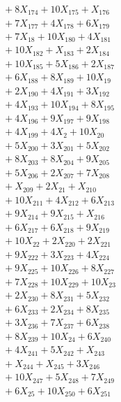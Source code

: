\documentclass[a4paper,10pt]{article}
\begin{document}
{\begin{align}
&\quad  + 8X_{174} + 10X_{175} + X_{176} \\[0.5ex]
&\quad  + 7X_{177} + 4X_{178} + 6X_{179} \\[0.5ex]
&\quad  + 7X_{18} + 10X_{180} + 4X_{181} \\[0.5ex]
&\quad  + 10X_{182} + X_{183} + 2X_{184} \\[0.5ex]
&\quad  + 10X_{185} + 5X_{186} + 2X_{187} \\[0.5ex]
&\quad  + 6X_{188} + 8X_{189} + 10X_{19} \\[0.5ex]
&\quad  + 2X_{190} + 4X_{191} + 3X_{192} \\[0.5ex]
&\quad  + 4X_{193} + 10X_{194} + 8X_{195} \\[0.5ex]
&\quad  + 4X_{196} + 9X_{197} + 9X_{198} \\[0.5ex]
&\quad  + 4X_{199} + 4X_{2} + 10X_{20} \\[0.5ex]
&\quad  + 5X_{200} + 3X_{201} + 5X_{202} \\[0.5ex]
&\quad  + 8X_{203} + 8X_{204} + 9X_{205} \\[0.5ex]
&\quad  + 5X_{206} + 2X_{207} + 7X_{208} \\[0.5ex]
&\quad  + X_{209} + 2X_{21} + X_{210} \\[0.5ex]
&\quad  + 10X_{211} + 4X_{212} + 6X_{213} \\[0.5ex]
&\quad  + 9X_{214} + 9X_{215} + X_{216} \\[0.5ex]
&\quad  + 6X_{217} + 6X_{218} + 9X_{219} \\[0.5ex]
&\quad  + 10X_{22} + 2X_{220} + 2X_{221} \\[0.5ex]
&\quad  + 9X_{222} + 3X_{223} + 4X_{224} \\[0.5ex]
&\quad  + 9X_{225} + 10X_{226} + 8X_{227} \\[0.5ex]
&\quad  + 7X_{228} + 10X_{229} + 10X_{23} \\[0.5ex]
&\quad  + 2X_{230} + 8X_{231} + 5X_{232} \\[0.5ex]
&\quad  + 6X_{233} + 2X_{234} + 8X_{235} \\[0.5ex]
&\quad  + 3X_{236} + 7X_{237} + 6X_{238} \\[0.5ex]
&\quad  + 8X_{239} + 10X_{24} + 6X_{240} \\[0.5ex]
&\quad  + 4X_{241} + 5X_{242} + X_{243} \\[0.5ex]
&\quad  + X_{244} + X_{245} + 3X_{246} \\[0.5ex]
&\quad  + 10X_{247} + 5X_{248} + 7X_{249} \\[0.5ex]
&\quad  + 6X_{25} + 10X_{250} + 6X_{251} \\[0.5ex]

\end{align}}
\end{document}
